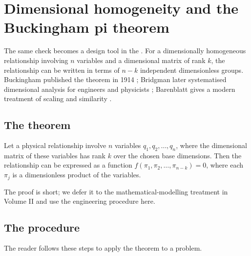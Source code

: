 \section{Dimensional homogeneity and the Buckingham pi
theorem}

The same check becomes a design tool in the . For a dimensionally homogeneous relationship involving $n$
variables and a dimensional matrix of rank $k$, the relationship can
be written in terms of $n - k$ independent dimensionless groups.
Buckingham published the theorem in 1914 \cite{paper:buckingham1914};
Bridgman later systematised dimensional analysis for engineers and
physicists \cite{text:bridgman1922}; Barenblatt gives a modern
treatment of scaling and similarity \cite{text:barenblatt1996}.

\subsection{The theorem}

\begin{theorem}[Buckingham pi]
Let a physical relationship involve $n$ variables $q_{1}, q_{2},
\ldots, q_{n}$, where the dimensional matrix of these variables has
rank $k$ over the chosen base dimensions. Then the relationship can
be expressed as a function $f(\pi_{1}, \pi_{2}, \ldots, \pi_{n - k})
= 0$, where each $\pi_{j}$ is a dimensionless product of the
variables.
\end{theorem}

The proof is short; we defer it to the mathematical-modelling
treatment in Volume II and use the engineering procedure here.

\subsection{The procedure}

The reader follows these steps to apply the theorem to a problem.

